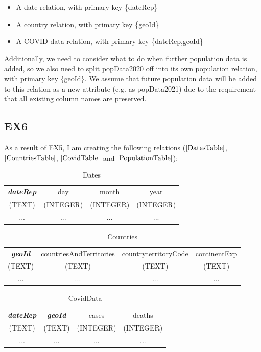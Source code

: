 \documentclass{article}
\begin{document}
\begin{itemize}
\item A date relation, with primary key \{dateRep\}
\item A country relation, with primary key \{geoId\}
\item A COVID data relation, with primary key \{dateRep,geoId\}
\end{itemize}

Additionally, we need to consider what to do when further population data is added, so we also need to split popData2020 off into its own population relation, with primary key \{geoId\}. We assume that future population data will be added to this relation as a new attribute (e.g. as popData2021) due to the requirement that all existing column names are preserved.

\subsection{EX6}

As a result of EX5, I am creating the following relations ($\ref{DatesTable}$, $\ref{CountriesTable}$, $\ref{CovidTable}$ and $\ref{PopulationTable}$):

\begin{table}[ht]
\centering
\begin{tabular}{|c|c|c|c|}
    \hline
     \textbf{\textit{dateRep}}&day&month&year\\
     (TEXT)&(INTEGER)&(INTEGER)&(INTEGER)\\
     \hline
     ...&...&...&...\\
     \hline
\end{tabular}
\caption{Dates}
\label{DatesTable}
\end{table}

\begin{table}[ht]
\centering
\begin{tabular}{|c|c|c|c|}
    \hline
     \textbf{\textit{geoId}}&countriesAndTerritories&countryterritoryCode&continentExp\\
     (TEXT)&(TEXT)&(TEXT)&(TEXT)\\
     \hline
     ...&...&...&...\\
     \hline
\end{tabular}
\caption{Countries}
\label{CountriesTable}
\end{table}

\begin{table}[ht]
\centering
\begin{tabular}{|c|c|c|c|}
    \hline
     \textbf{\textit{dateRep}}&\textbf{\textit{geoId}}&cases&deaths\\
     (TEXT)&(TEXT)&(INTEGER)&(INTEGER)\\
     \hline
     ...&...&...&...\\
     \hline
\end{tabular}
\caption{CovidData}
\label{CovidTable}
\end{table}
\end{document}
